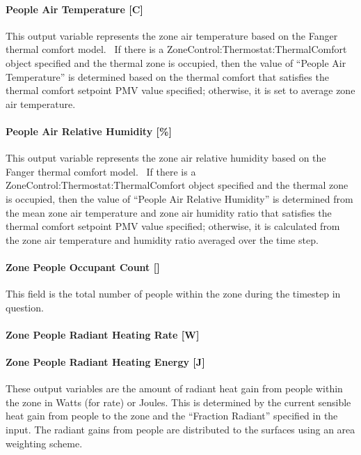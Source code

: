 \paragraph{People Air Temperature {[}C{]}}\label{people-air-temperature-c}

This output variable represents the zone air temperature based on the Fanger thermal comfort model.~ If there is a ZoneControl:Thermostat:ThermalComfort object specified and the thermal zone is occupied, then the value of ``People Air Temperature'' is determined based on the thermal comfort that satisfies the thermal comfort setpoint PMV value specified; otherwise, it is set to average zone air temperature.

\paragraph{People Air Relative Humidity {[}\%{]}}\label{people-air-relative-humidity}

This output variable represents the zone air relative humidity based on the Fanger thermal comfort model.~ If there is a ZoneControl:Thermostat:ThermalComfort object specified and the thermal zone is occupied, then the value of ``People Air Relative Humidity'' is determined from the mean zone air temperature and zone air humidity ratio that satisfies the thermal comfort setpoint PMV value specified; otherwise, it is calculated from the zone air temperature and humidity ratio averaged over the time step.

\paragraph{Zone People Occupant Count {[]}}\label{zone-people-occupant-count}

This field is the total number of people within the zone during the timestep in question.

\paragraph{Zone People Radiant Heating Rate {[}W{]}}\label{zone-people-radiant-heating-rate-w}

\paragraph{Zone People Radiant Heating Energy {[}J{]}}\label{zone-people-radiant-heating-energy-j}

These output variables are the amount of radiant heat gain from people within the zone in Watts (for rate) or Joules. This is determined by the current sensible heat gain from people to the zone and the ``Fraction Radiant'' specified in the input. The radiant gains from people are distributed to the surfaces using an area weighting scheme.

